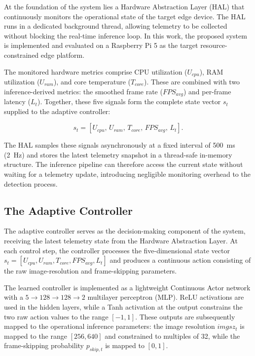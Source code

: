 \documentclass{ieeeaccess}
\begin{document}
At the foundation of the system lies a Hardware Abstraction Layer (HAL) that
continuously monitors the operational state of the target edge device. The
HAL runs in a dedicated background thread, allowing telemetry to be collected
without blocking the real-time inference loop. In this work, the proposed
system is implemented and evaluated on a Raspberry Pi 5 as the target
resource-constrained edge platform.

The monitored hardware metrics comprise CPU utilization ($U_{cpu}$), RAM
utilization ($U_{ram}$), and core temperature ($T_{core}$). These are combined
with two inference-derived metrics: the smoothed frame rate ($FPS_{avg}$) and
per-frame latency ($L_t$). Together, these five signals form the complete
state vector $s_t$ supplied to the adaptive controller:

\begin{equation}
s_t =
[U_{cpu},\, U_{ram},\, T_{core},\, FPS_{avg},\, L_t].
\end{equation}

The HAL samples these signals asynchronously at a fixed interval of 500~ms
(2~Hz) and stores the latest telemetry snapshot in a thread-safe in-memory
structure. The inference pipeline can therefore access the current state
without waiting for a telemetry update, introducing negligible monitoring
overhead to the detection process.

\subsection{The Adaptive Controller}

The adaptive controller serves as the decision-making component of the
system, receiving the latest telemetry state from the Hardware Abstraction
Layer. At each control step, the controller processes the five-dimensional
state vector
$s_t = [U_{cpu}, U_{ram}, T_{core}, FPS_{avg}, L_t]$
and produces a continuous action consisting of the raw image-resolution and
frame-skipping parameters.

The learned controller is implemented as a lightweight Continuous Actor
network with a $5 \rightarrow 128 \rightarrow 128 \rightarrow 2$ multilayer
perceptron (MLP). ReLU activations are used in the hidden layers, while a
Tanh activation at the output constrains the two raw action values to the
range $[-1,1]$. These outputs are subsequently mapped to the operational
inference parameters: the image resolution $imgsz_t$ is mapped to the range
$[256,640]$ and constrained to multiples of 32, while the frame-skipping
probability $p_{skip,t}$ is mapped to $[0,1]$.
\end{document}
